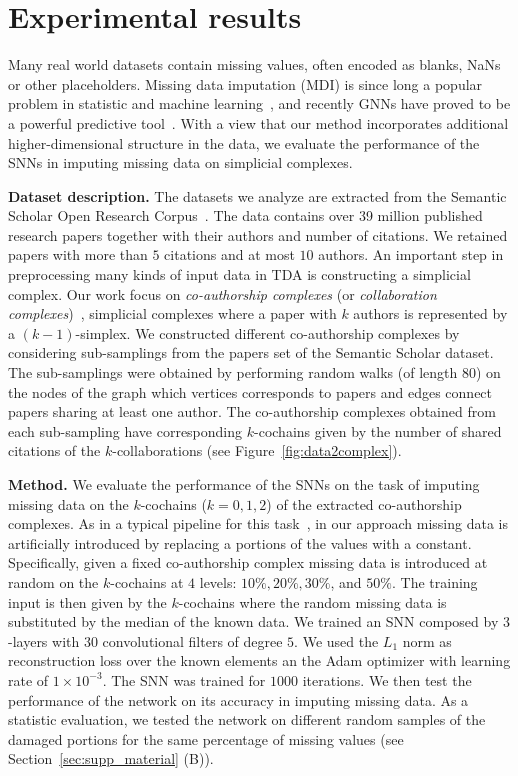 \section{Experimental results}
Many real world datasets contain missing values, often encoded as blanks, NaNs or other placeholders. Missing data imputation (MDI) is since long a popular problem in statistic and machine learning~\cite{little1986statistical, nelwamondo2007missing}, and recently GNNs have proved to be a powerful predictive tool~\cite{spinelli2020neural}. With a view that our method incorporates additional higher-dimensional structure in the data, we evaluate the performance of the SNNs in imputing missing data on simplicial complexes.

\textbf{Dataset description.} The datasets we analyze are extracted from the Semantic Scholar Open Research Corpus~\cite{ammar18NAACL}. The data contains over 39 million published research papers together with their authors and number of citations. We retained papers with more than $5$ citations and at most $10$ authors. An important step in preprocessing many kinds of input data in TDA is constructing a simplicial complex. Our work focus on \emph{co-authorship complexes} (or \emph{collaboration complexes})~\cite{patania2017}, simplicial complexes where a paper with $k$ authors is represented by a $(k-1)$-simplex. We constructed different co-authorship complexes by considering sub-samplings from the papers set of the Semantic Scholar dataset. The sub-samplings were obtained by performing random walks (of length $80$) on the nodes of the graph which vertices corresponds to papers and edges connect papers sharing at least one author. The co-authorship complexes obtained from each sub-sampling have corresponding $k$-cochains given by the number of shared citations of the $k$-collaborations (see Figure~\ref{fig:data2complex}).

\textbf{Method.} We evaluate the performance of the SNNs on the task of imputing missing data on the $k$-cochains ($k=0,1,2$) of the extracted co-authorship complexes. As in a typical pipeline for this task~\cite{nelwamondo2007missing}, in our approach missing data is artificially introduced by replacing a portions of the values with a constant. Specifically, given a fixed co-authorship complex missing data is introduced at random on the $k$-cochains at $4$ levels: $10\%,  20\%,  30\%$, and $50\% $. The training input is then given by the $k$-cochains where the random missing data is substituted by the median of the known data. We trained an SNN composed by $3$-layers with $30$ convolutional filters of degree $5$. We used the $L_1$ norm as reconstruction loss over the known elements an the Adam optimizer with learning rate of $1\times 10^{-3}$. The SNN was trained for $1000$ iterations. We then test the performance of the network on its accuracy in imputing missing data. As a statistic evaluation, we tested the network on different random samples of the damaged portions for the same percentage of missing values (see Section~\ref{sec:supp_material} (B)). 

